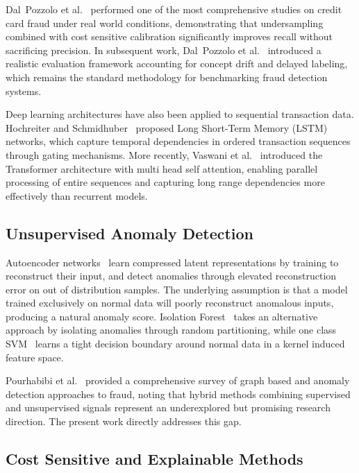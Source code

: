 \documentclass[conference]{IEEEtran}
\begin{document}
Dal~Pozzolo et al.~\cite{dal_pozzolo2015calibrating} performed one of the most comprehensive studies on credit card fraud under real world conditions, demonstrating that undersampling combined with cost sensitive calibration significantly improves recall without sacrificing precision. In subsequent work, Dal~Pozzolo et al.~\cite{dal_pozzolo2017credit} introduced a realistic evaluation framework accounting for concept drift and delayed labeling, which remains the standard methodology for benchmarking fraud detection systems.

Deep learning architectures have also been applied to sequential transaction data. Hochreiter and Schmidhuber~\cite{hochreiter1997long} proposed Long Short-Term Memory (LSTM) networks, which capture temporal dependencies in ordered transaction sequences through gating mechanisms. More recently, Vaswani et al.~\cite{vaswani2017attention} introduced the Transformer architecture with multi head self attention, enabling parallel processing of entire sequences and capturing long range dependencies more effectively than recurrent models.

\subsection{Unsupervised Anomaly Detection}

Autoencoder networks~\cite{hinton2006reducing} learn compressed latent representations by training to reconstruct their input, and detect anomalies through elevated reconstruction error on out of distribution samples. The underlying assumption is that a model trained exclusively on normal data will poorly reconstruct anomalous inputs, producing a natural anomaly score. Isolation Forest~\cite{liu2008isolation} takes an alternative approach by isolating anomalies through random partitioning, while one class SVM~\cite{scholkopf2001estimating} learns a tight decision boundary around normal data in a kernel induced feature space.

Pourhabibi et al.~\cite{pourhabibi2020fraud} provided a comprehensive survey of graph based and anomaly detection approaches to fraud, noting that hybrid methods combining supervised and unsupervised signals represent an underexplored but promising research direction. The present work directly addresses this gap.

\subsection{Cost Sensitive and Explainable Methods}
\end{document}
